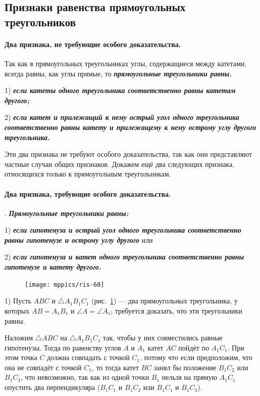 \documentclass[oneside]{book}
\begin{document}
\subsection*{Признаки равенства прямоугольных треугольников}

\paragraph{Два признака, не требующие особого доказательства.}\label{1938/56}

Так как в прямоугольных треугольниках углы, содержащиеся между катетами, всегда равны, как углы прямые, то \textbf{\emph{прямоугольные треугольники равны.}}

1) \textbf{\emph{если катеты одного треугольника соответственно равны катетам другого;}}

2) \textbf{\emph{если катет и прилежащий к нему острый угол одного треугольника соответственно равны катету и прилежащему к нему острому углу другого треугольника.}}

Эти два признака не требуют особого доказательства, так как они представляют частные случаи общих признаков.
Докажем ещё два следующих признака, относящихся только к прямоугольным треугольникам.

\paragraph{Два признака, требующие особого доказательства.}\label{1938/57}
.
\textbf{\emph{Прямоугольные треугольники равны:}}

1) \textbf{\emph{если гипотенуза и острый угол одного треугольника соответственно равны гипотенузе и острому углу другого}} или

2) \textbf{\emph{если гипотенуза и катет одного треугольника соответственно равны гипотенузе и катету другого.}}

\begin{figure}[h!]
\centering
\texttt{[image: mppics/ris-60]}
\caption{}\label{1938/ris-60}
\end{figure}

1) Пусть $ABC$ и $\triangle A_1B_1C_1$ (рис.~\ref{1938/ris-60}) — два прямоугольных треугольника, у которых $AB=A_1B_1$ и $\angle A = \angle A_1$;
требуется доказать, что эти треугольники равны.

Наложим $\triangle ABC$ на $\triangle A_1B_1C_1$ так, чтобы у них совместились равные гипотенузы.
Тогда по равенству углов $A$ и $A_1$ катет $AC$ пойдёт по $A_1C_1$.
При этом точка $C$ должна совпадать с точкой $C_1$, потому что если предположим, что она не совпадёт с точкой $C_1$, то тогда катет $BC$ занял бы положение $B_1C_2$ или $B_1C_3$, что невозможно, так как из одной точки $B_1$ нельзя на прямую $A_1C_1$ опустить два перпендикуляра ($B_1C_1$ и $B_1C_2$ или $B_1C_1$ и $B_1C_3$).
\end{document}

